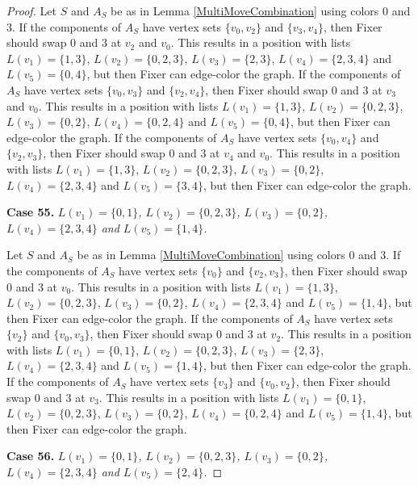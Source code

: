 \documentclass[12pt]{amsart}
\theoremstyle{plain}
\theoremstyle{definition}
\theoremstyle{remark}
\begin{document}
\begin{proof}
Let $S$ and $A_S$ be as in Lemma \ref{MultiMoveCombination} using colors $0$ and $3$. If the components of $A_S$ have vertex sets $\{v_0, v_2\}$ and $\{v_3, v_4\}$, then Fixer should swap 0 and 3 at $v_2$ and $v_0$. This results in a position with lists $L(v_1) = \{1, 3\}$, $L(v_2) = \{0, 2, 3\}$, $L(v_3) = \{2, 3\}$, $L(v_4) = \{2, 3, 4\}$ and $L(v_5) = \{0, 4\}$, but then Fixer can edge-color the graph.
If the components of $A_S$ have vertex sets $\{v_0, v_3\}$ and $\{v_2, v_4\}$, then Fixer should swap 0 and 3 at $v_3$ and $v_0$. This results in a position with lists $L(v_1) = \{1, 3\}$, $L(v_2) = \{0, 2, 3\}$, $L(v_3) = \{0, 2\}$, $L(v_4) = \{0, 2, 4\}$ and $L(v_5) = \{0, 4\}$, but then Fixer can edge-color the graph.
If the components of $A_S$ have vertex sets $\{v_0, v_4\}$ and $\{v_2, v_3\}$, then Fixer should swap 0 and 3 at $v_4$ and $v_0$. This results in a position with lists $L(v_1) = \{1, 3\}$, $L(v_2) = \{0, 2, 3\}$, $L(v_3) = \{0, 2\}$, $L(v_4) = \{2, 3, 4\}$ and $L(v_5) = \{3, 4\}$, but then Fixer can edge-color the graph.

\noindent\textbf{Case 55.  }\textit{$L(v_1) = \{0, 1\}$, $L(v_2) = \{0, 2, 3\}$, $L(v_3) = \{0, 2\}$, $L(v_4) = \{2, 3, 4\}$ and $L(v_5) = \{1, 4\}$.}

Let $S$ and $A_S$ be as in Lemma \ref{MultiMoveCombination} using colors $0$ and $3$. If the components of $A_S$ have vertex sets $\{v_0\}$ and $\{v_2, v_3\}$, then Fixer should swap 0 and 3 at $v_0$. This results in a position with lists $L(v_1) = \{1, 3\}$, $L(v_2) = \{0, 2, 3\}$, $L(v_3) = \{0, 2\}$, $L(v_4) = \{2, 3, 4\}$ and $L(v_5) = \{1, 4\}$, but then Fixer can edge-color the graph.
If the components of $A_S$ have vertex sets $\{v_2\}$ and $\{v_0, v_3\}$, then Fixer should swap 0 and 3 at $v_2$. This results in a position with lists $L(v_1) = \{0, 1\}$, $L(v_2) = \{0, 2, 3\}$, $L(v_3) = \{2, 3\}$, $L(v_4) = \{2, 3, 4\}$ and $L(v_5) = \{1, 4\}$, but then Fixer can edge-color the graph.
If the components of $A_S$ have vertex sets $\{v_3\}$ and $\{v_0, v_2\}$, then Fixer should swap 0 and 3 at $v_3$. This results in a position with lists $L(v_1) = \{0, 1\}$, $L(v_2) = \{0, 2, 3\}$, $L(v_3) = \{0, 2\}$, $L(v_4) = \{0, 2, 4\}$ and $L(v_5) = \{1, 4\}$, but then Fixer can edge-color the graph.

\noindent\textbf{Case 56.  }\textit{$L(v_1) = \{0, 1\}$, $L(v_2) = \{0, 2, 3\}$, $L(v_3) = \{0, 2\}$, $L(v_4) = \{2, 3, 4\}$ and $L(v_5) = \{2, 4\}$.}


\end{proof}
\end{document}
